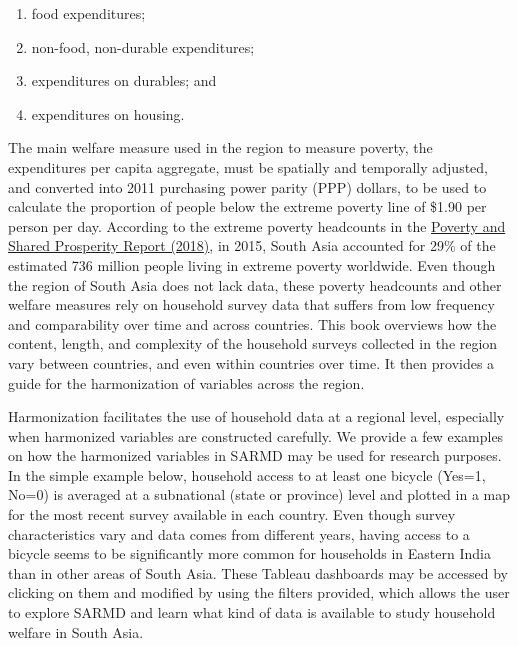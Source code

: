 \documentclass[13 pt,]{book}
\providecommand{\tightlist}{%
  \setlength{\itemsep}{0pt}\setlength{\parskip}{0pt}}
\begin{document}
\begin{enumerate}
\def\labelenumi{\roman{enumi}.}
\tightlist
\item
  food expenditures;
\item
  non-food, non-durable expenditures;
\item
  expenditures on durables; and
\item
  expenditures on housing.
\end{enumerate}

The main welfare measure used in the region to measure poverty, the
expenditures per capita aggregate, must be spatially and temporally
adjusted, and converted into 2011 purchasing power parity (PPP) dollars,
to be used to calculate the proportion of people below the extreme
poverty line of \$1.90 per person per day. According to the extreme
poverty headcounts in the
\href{http://www.worldbank.org/en/publication/poverty-and-shared-prosperity}{Poverty
and Shared Prosperity Report (2018)}, in 2015, South Asia accounted for
29\% of the estimated 736 million people living in extreme poverty
worldwide. Even though the region of South Asia does not lack data,
these poverty headcounts and other welfare measures rely on household
survey data that suffers from low frequency and comparability over time
and across countries. This book overviews how the content, length, and
complexity of the household surveys collected in the region vary between
countries, and even within countries over time. It then provides a guide
for the harmonization of variables across the region.

Harmonization facilitates the use of household data at a regional level,
especially when harmonized variables are constructed carefully. We
provide a few examples on how the harmonized variables in SARMD may be
used for research purposes. In the simple example below, household
access to at least one bicycle (Yes=1, No=0) is averaged at a
subnational (state or province) level and plotted in a map for the most
recent survey available in each country. Even though survey
characteristics vary and data comes from different years, having access
to a bicycle seems to be significantly more common for households in
Eastern India than in other areas of South Asia. These Tableau
dashboards may be accessed by clicking on them and modified by using the
filters provided, which allows the user to explore SARMD and learn what
kind of data is available to study household welfare in South Asia.
\end{document}
